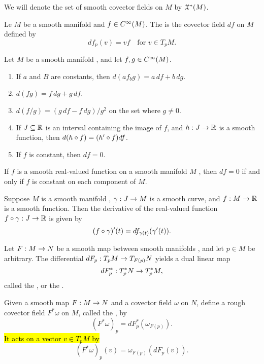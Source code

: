 \nb We will denote the set of smooth covector fields on $M$ by $\mathfrak{X}^*(M)$.

\dfn Le $M$ be a smooth manifold and $f\in C^\infty(M)$. The  is the covector field $df$ on $M$ defined by
\[df_p(v) = vf\quad\text{for } v\in T_pM.\]


\setcounter{thm}{19}

\begin{prop}
Let $M$ be a smooth manifold \wowob, and let $f,g\in C^\infty(M)$.
\begin{enumerate}
    \item If $a$ and $B$ are constants, then $d(af _ bg) = a\,df + b\,dg$.
    \item $d(fg) = f\,dg + g\,df$.
    \item $d(f/g) = (g\,df - f\,dg)/g^2$ on the set where $g\neq 0$.
    \item If $J\subseteq \mathbb{R}$ is an interval containing the image of $f$, and $h:J\rightarrow \mathbb{R}$ is a smooth function, then $d(h\circ f) = (h^\prime\circ f)df$.
    \item If $f$ is constant, then $df = 0$.
\end{enumerate}
\end{prop}

\setcounter{thm}{21}

\begin{prop}
If $f$ is a smooth real-valued function on a smooth manifold $M$ \wowob, then $df = 0$ if and only if $f$ is constant on each component of $M$.
\end{prop}

\begin{prop}
Suppose $M$ is a smooth manifold \wowob, $\gamma:J\rightarrow M$ is a smooth curve, and $f:M\rightarrow \mathbb{R}$ is a smooth function. Then the derivative of the real-valued function $f\circ\gamma:J\rightarrow \mathbb{R}$ is given by
\[(f\circ \gamma)^\prime(t)= df_{\gamma(t)} (\gamma^\prime(t)).\]
\end{prop}

\dfng Let $F:M\rightarrow N$ be a smooth map between smooth manifolds \wowob, and let $p\in M$ be arbitrary. The differential $dF_p:T_pM\rightarrow T_{F(p)}N$ yields a dual linear map
\[dF_p^*:T^*_pN\rightarrow T^*_pM,\]
called the , or the .

\dfn Given a smooth map $F:M\rightarrow N$ and a covector field $\omega$ on $N$, define a rough covector field $F^*\omega$ on $M$, called the , by
\[(F^*\omega)_p = dF^*_p(\omega_{F(p)}).\]
\hl{It acts on a vector $v\in T_pM$ by}
\[(F^*\omega)_p(v) = \omega_{F(p)}(dF_p(v)).\]

